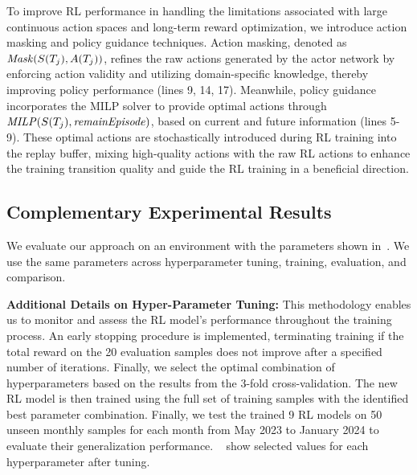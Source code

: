 To improve RL performance in handling the limitations associated with large continuous action spaces and long-term reward optimization, we introduce action masking and policy guidance techniques. 
%
Action masking, denoted as ${\it Mask}(S(T_j), A(T_j))$, refines the raw actions generated by the actor network by enforcing action validity and utilizing domain-specific knowledge, thereby improving policy performance (lines 9, 14, 17). Meanwhile, policy guidance incorporates the MILP solver to provide optimal actions through ${\it MILP}(S(T_j), {\it remainEpisode})$, based on current and future information (lines 5-9). These optimal actions are stochastically introduced during RL training into the replay buffer, mixing high-quality actions with the raw RL actions to enhance the training transition quality and guide the RL training in a beneficial direction. 



 
% 




\subsection{Complementary Experimental Results}
\label{appendix:results}
We evaluate our approach on an environment with the parameters shown in~. We use the same parameters across hyperparameter tuning, training, evaluation, and comparison.

\noindent \textbf{Additional Details on Hyper-Parameter Tuning:} This methodology enables us to monitor and assess the RL model's performance throughout the training process. 
An early stopping procedure is implemented, terminating training if the total reward on the 20 evaluation samples does not improve after a specified number of iterations. Finally, we select the optimal combination of hyperparameters based on the results from the 3-fold cross-validation. The new RL model is then trained using the full set of training samples with the identified best parameter combination. Finally, we test the trained 9 RL models on 50 unseen monthly samples for each month from May 2023 to January 2024 to evaluate their generalization performance. ~ show selected values for each hyperparameter after tuning.


